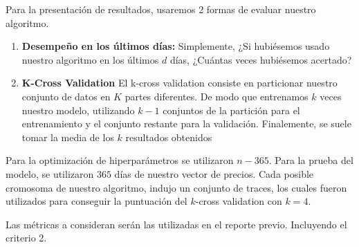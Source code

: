 \documentclass[11pt]{article}
\begin{document}
Para la presentación de resultados, usaremos 2 formas de evaluar nuestro algoritmo. 
\begin{enumerate}
    \item \textbf{Desempeño en los últimos días:} Simplemente, ¿Si hubiésemos usado nuestro algoritmo en los últimos $d$ días, ¿Cuántas veces hubiésemos acertado?
    \item \textbf{K-Cross Validation} El k-cross validation consiste en particionar nuestro conjunto de datos en $K$ partes diferentes. De modo que entrenamos $k$ veces nuestro modelo, utilizando $k-1$ conjuntos de la partición para el entrenamiento y  el conjunto restante para la validación. Finalemente, se suele tomar la media de los $k$ resultados obtenidos
\end{enumerate}

Para la optimización de hiperparámetros se utilizaron $n-365$. Para la prueba del modelo, se utilizaron $365$ días de nuestro vector de precios. Cada posible cromosoma de nuestro algoritmo, indujo un conjunto de traces, los cuales fueron utilizados para conseguir la puntuación del $k$-cross validation con $k=4$.

Las métricas a consideran serán las utilizadas en el reporte previo. Incluyendo el criterio 2.
\end{document}
